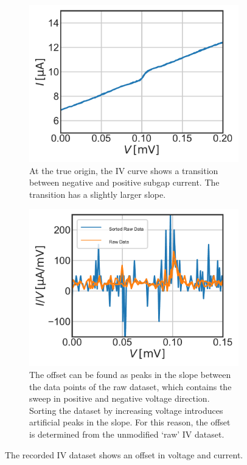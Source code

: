 \documentclass[]{article}
\begin{document}
\begin{figure}
	\centering              
	\begin{subfigure}[t]{0.49\textwidth}
		\centering
		\includegraphics[width=\linewidth]{./../IV_Class_Unit_Test/2020_01_14/Raw_Data_at_Origin.pdf}
		\caption{At the true origin, the IV curve shows a transition between negative and positive subgap current. The transition has a slightly larger slope. }
	\end{subfigure}
	\begin{subfigure}[t]{0.49\textwidth}
		\centering
		\includegraphics[width=\linewidth]{./../IV_Class_Unit_Test/2020_01_14/Sorted_vs_Unsorted_Slope.pdf}
		\caption{The offset can be found as peaks in the slope between the data points of the raw dataset, which contains the sweep in positive and negative voltage direction. Sorting the dataset by increasing voltage introduces artificial peaks in the slope. For this reason, the offset is determined from the unmodified `raw' IV dataset.}
	\end{subfigure}
	\caption[]{The recorded IV dataset shows an offset in voltage and current.
	}
	\label{fig:rawDataSlopebyVoltage}
\end{figure}
\end{document}

